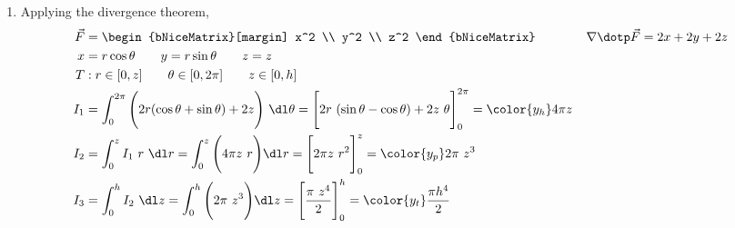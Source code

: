 \begin{enumerate}
    \item Applying the divergence theorem,
          \begin{align}
              \vec{F} & = \begin{bNiceMatrix}[margin]
                              x^2 \\ y^2 \\ z^2
                          \end{bNiceMatrix} \qquad\qquad
              \nabla \dotp \vec{F} = 2x + 2y + 2z                         \\
              x       & = r\cos \theta \qquad y = r\sin \theta
              \qquad z = z                                                \\
              T       & : r \in [0, z] \qquad \theta \in [0, 2\pi] \qquad
              z \in [0, h]                                                \\
              I_1     & = \int_{0}^{2\pi} \Bigg(2r(\cos \theta
              + \sin \theta) + 2z\Bigg)
              \ \dl \theta
              = \Bigg[ 2r\ (\sin \theta - \cos \theta) + 2z\ \theta \Bigg]_{0}^{2\pi}
              = {\color{y_h} 4\pi z}                                      \\
              I_2     & = \int_{0}^{z} I_1 \ r\ \dl r
              = \int_{0}^{z} \Bigg( 4\pi z\ r \Bigg) \dl r
              = \Bigg[ 2\pi z\ r^2 \Bigg]_{0}^{z}
              = {\color{y_p} 2\pi\ z^3 }                                  \\
              I_3     & = \int_{0}^{h} I_2\ \dl z = \int_{0}^{h}
              \Bigg( 2\pi\ z^3 \Bigg) \dl z
              = \Bigg[ \frac{\pi\ z^4}{2} \Bigg]_{0}^{h}
              = {\color{y_t} \frac{\pi h^4}{2}}
          \end{align}


\end{enumerate}
